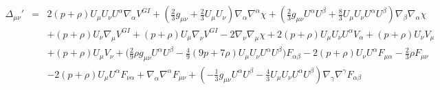 \documentclass[10pt,letterpaper]{article}
\numberwithin{equation}{section}
\begin{document}
\\ \\
\begin{eqnarray}
\Delta_{\mu\nu}'&=& 2 (p + \rho) U_{\mu } U_{\nu } U^{\alpha } \nabla_{\alpha }V^{GI}{} + (\tfrac{2}{3} g_{\mu \nu } + \tfrac{2}{3} U_{\mu } U_{\nu }) \nabla_{\alpha }\nabla^{\alpha }\chi + (\tfrac{2}{3} g_{\mu \nu } U^{\alpha } U^{\beta } + \tfrac{8}{3} U_{\mu } U_{\nu } U^{\alpha } U^{\beta }) \nabla_{\beta }\nabla_{\alpha }\chi \nonumber \\ 
&& + (p + \rho) U_{\nu } \nabla_{\mu }V^{GI}{} + (p + \rho) U_{\mu } \nabla_{\nu }V^{GI}{} - 2 \nabla_{\nu }\nabla_{\mu }\chi +2 (p + \rho) U_{\mu } U_{\nu } U^{\alpha } V_{\alpha } + (p + \rho) U_{\nu } V_{\mu } \nonumber \\ 
&& + (p + \rho) U_{\mu } V_{\nu }+\bigl(\tfrac{2}{9} \rho g_{\mu \nu } U^{\alpha } U^{\beta } -  \tfrac{4}{9} (9 p + 7 \rho) U_{\mu } U_{\nu } U^{\alpha } U^{\beta }\bigr) F_{\alpha \beta } - 2 (p + \rho) U_{\nu } U^{\alpha } F_{\mu \alpha } -  \tfrac{2}{3} \rho F_{\mu \nu } \nonumber \\ 
&& - 2 (p + \rho) U_{\mu } U^{\alpha } F_{\nu \alpha } + \nabla_{\alpha }\nabla^{\alpha }F_{\mu \nu } + (- \tfrac{1}{3} g_{\mu \nu } U^{\alpha } U^{\beta } -  \tfrac{4}{3} U_{\mu } U_{\nu } U^{\alpha } U^{\beta }) \nabla_{\gamma }\nabla^{\gamma }F_{\alpha \beta }
\end{eqnarray}
\end{document}
